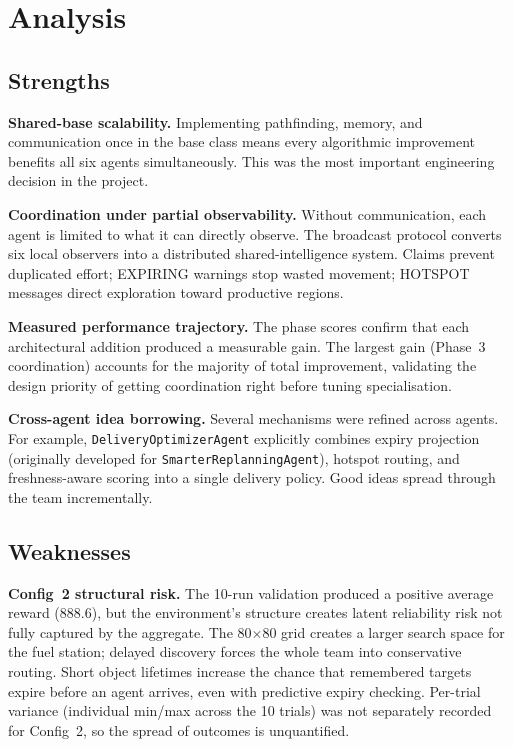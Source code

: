 \documentclass[letterpaper]{article}
\begin{document}
\section{Analysis}

\subsection{Strengths}

\textbf{Shared-base scalability.} Implementing pathfinding, memory, and
communication once in the base class means every algorithmic improvement
benefits all six agents simultaneously. This was the most important engineering
decision in the project.

\textbf{Coordination under partial observability.} Without communication, each
agent is limited to what it can directly observe. The broadcast protocol
converts six local observers into a distributed shared-intelligence system.
Claims prevent duplicated effort; EXPIRING warnings stop wasted movement;
HOTSPOT messages direct exploration toward productive regions.

\textbf{Measured performance trajectory.} The phase scores confirm that each
architectural addition produced a measurable gain. The largest gain (Phase~3
coordination) accounts for the majority of total improvement, validating the
design priority of getting coordination right before tuning specialisation.

\textbf{Cross-agent idea borrowing.} Several mechanisms were refined across
agents. For example, \texttt{DeliveryOptimizerAgent} explicitly combines expiry
projection (originally developed for \texttt{SmarterReplanningAgent}), hotspot
routing, and freshness-aware scoring into a single delivery policy. Good ideas
spread through the team incrementally.

\subsection{Weaknesses}

\textbf{Config~2 structural risk.} The 10-run validation produced a positive
average reward (888.6), but the environment's structure creates latent reliability
risk not fully captured by the aggregate. The 80$\times$80 grid creates a larger
search space for the fuel station; delayed discovery forces the whole team into
conservative routing. Short object lifetimes increase the chance that remembered
targets expire before an agent arrives, even with predictive expiry checking. Per-trial variance (individual min/max across the 10 trials) was not separately
recorded for Config~2, so the spread of outcomes is unquantified.
\end{document}
